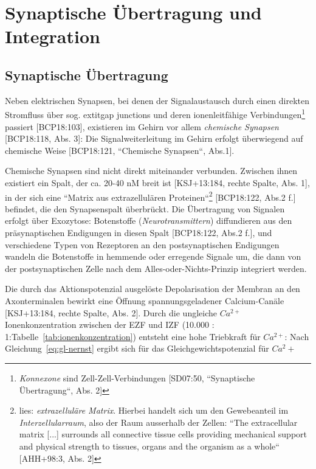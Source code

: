 {{\vskip 1.6in


\pagebreak

\section{Synaptische Übertragung und Integration}


\subsection{Synaptische Übertragung}\label{synaptischeuebertragung}
Neben elektrischen Synapsen, bei denen der Signalaustausch durch einen direkten Stromfluss über sog.  	extit{gap junctions} und deren ionenleitfähige Verbindungen\footnote{
 \textit{Konnexone} sind Zell-Zell-Verbindungen {[SD07:50, ``Synaptische Übertragung``, Abs. 2]}
} passiert [BCP18:103], existieren im Gehirn vor allem \textit{chemische Synapsen} [BCP18:118, Abs. 3]: Die Signalweiterleitung im Gehirn erfolgt überwiegend auf chemische Weise [BCP18:121, ``Chemische Synapsen``, Abs.1].

Chemische Synapsen sind nicht direkt miteinander verbunden. 
Zwischen ihnen existiert ein Spalt, der ca. 20-40 nM breit ist [KSJ+13:184, rechte Spalte, Abs. 1], in der sich eine ``Matrix aus extrazellulären Proteinen``\footnote{
 lies: \textit{extrazelluläre Matrix}. Hierbei handelt sich um den Gewebeanteil im \textit{Interzellularraum}, also der Raum ausserhalb der Zellen: ``The extracellular matrix {[...]} surrounds all connective tissue cells providing mechanical support and physical strength to tissues, organs and the organism as a whole`` {[AHH+98:3, Abs. 2]}
}  [BCP18:122, Abs.2 f.] befindet, die den Synapsenspalt überbrückt.
Die Übertragung von Signalen erfolgt über Exozytose: Botenstoffe (\textit{Neurotransmittern}) diffundieren  aus den präsynaptischen Endigungen in diesen Spalt [BCP18:122, Abs.2 f.], und verschiedene Typen von Rezeptoren an den postsynaptischen Endigungen wandeln die Botenstoffe in hemmende oder erregende Signale um, die dann von der postsynaptischen Zelle nach dem Alles-oder-Nichts-Prinzip integriert werden.

Die durch das Aktionspotenzial ausgelöste Depolarisation der Membran an den Axonterminalen bewirkt eine Öffnung spannungsgeladener Calcium-Canäle [KSJ+13:184, rechte Spalte, Abs. 2].
Durch die ungleiche $Ca^{2+}$ Ionenkonzentration zwischen der EZF und IZF (10.000 : 1:Tabelle~\ref{tab:ionenkonzentration}) entsteht eine hohe Triebkraft für $Ca^{2+}$: Nach Gleichung~\ref{eq:gl-nernst} ergibt sich für das Gleichgewichtspotenzial für $Ca^2+$

}}
